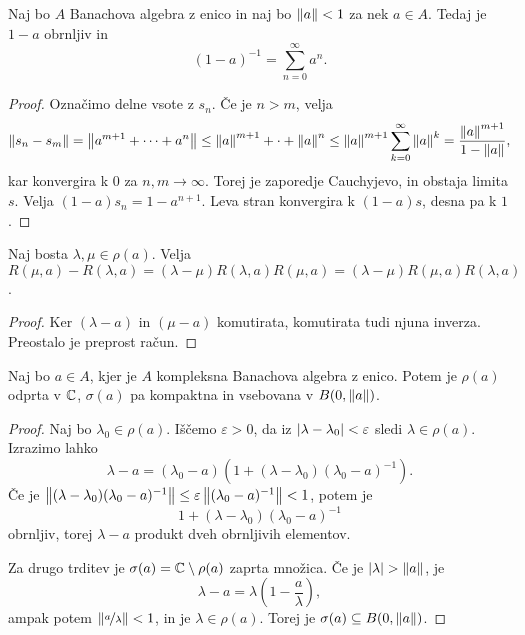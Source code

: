 
\begin{izrek}
  Naj bo $A$ Banachova algebra z enico in naj bo $\left\lVert a\right\rVert < 1$ za nek $a \in
  A$.
  Tedaj je $1 - a$ obrnljiv in
  \[
	(1 - a)^{-1} = \sum_{n=0}^\infty a^n.
  \]
\end{izrek}

\begin{proof}
  Označimo delne vsote z $s_n$.
  Če je $n > m$, velja
  \[
	\left\lVert s_n - s_m\right\rVert
	= \left\lVert a^{m+1} + \cdots + a^n\right\rVert
	\le \left\lVert a\right\rVert^{m+1} + \cdot + \left\lVert a\right\rVert^n
	\le \left\lVert a\right\rVert^{m+1} \sum_{k=0}^\infty \left\lVert a\right\rVert^k
	= \frac{\left\lVert a\right\rVert^{m+1}}{1 - \left\lVert a\right\rVert},
  \]
  kar konvergira k $0$ za $n, m \to \infty$.
  Torej je zaporedje Cauchyjevo, in obstaja limita $s$.
  Velja $(1 - a) s_n = 1 - a^{n+1}$.
  Leva stran konvergira k $(1-a)s$, desna pa k $1$.
\end{proof}


\begin{lema}
  Naj bosta $\lambda, \mu \in \rho(a)$.
  Velja $R(\mu, a) - R(\lambda, a) = (\lambda - \mu) R(\lambda, a) R(\mu, a) =
  (\lambda - \mu) R(\mu,a) R(\lambda, a)$.
\end{lema}

\begin{proof}
  Ker $(\lambda - a)$ in $(\mu - a)$ komutirata, komutirata tudi njuna inverza.
  Preostalo je preprost račun.
\end{proof}

\begin{trditev}
  Naj bo $a \in A$, kjer je $A$ kompleksna Banachova algebra z enico.
  Potem je $\rho(a)$ odprta v $\mathbb{C}$, $\sigma(a)$ pa kompaktna in vsebovana v
  $B(0, \left\lVert a\right\rVert)$.
\end{trditev}

\begin{proof}
  Naj bo $\lambda_0 \in \rho(a)$.
  Iščemo $\varepsilon > 0$, da iz $\left| \lambda - \lambda_0 \right| < \varepsilon$
  sledi $\lambda \in \rho(a)$.
  Izrazimo lahko
  \[
	\lambda - a = (\lambda_0 - a)(1 + (\lambda - \lambda_0)(\lambda_0 - a)^{-1}).
  \]
  Če je $\left\lVert(\lambda - \lambda_0)(\lambda_0 -a)^{-1}\right\rVert \le \varepsilon
  \left\lVert(\lambda_0 - a)^{-1}\right\rVert < 1$, potem je
  \[
	1 + (\lambda - \lambda_0)(\lambda_0 - a)^{-1}
  \]
  obrnljiv, torej $\lambda - a$ produkt dveh obrnljivih elementov.

  Za drugo trditev je $\sigma(a) = \mathbb{C} \setminus \rho(a)$ zaprta množica.
  Če je $\left| \lambda \right| > \left\lVert a\right\rVert$, je
  \[
	\lambda - a = \lambda (1 - \frac{a}{\lambda}),
  \]
  ampak potem $\left\lVert\nicefrac{a}{\lambda}\right\rVert < 1$, in je $\lambda \in \rho(a)$.
  Torej je $\sigma(a) \subseteq B(0, \left\lVert a\right\rVert)$.
\end{proof}

